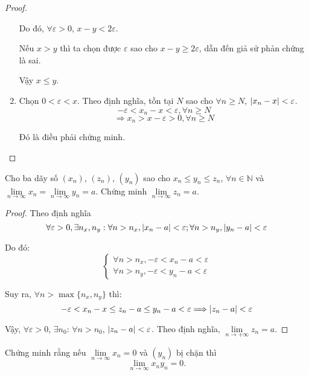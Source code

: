 \documentclass[class=analysis,crop=false]{standalone}
\begin{document}
\begin{proof}
\begin{enumerate}[label = (\roman*)]
            \par Do đó, $\forall\varepsilon > 0$, $x - y < 2\varepsilon$.
            \par Nếu $x > y$ thì ta chọn được $\varepsilon$ sao cho $x - y \ge 2\varepsilon$, dẫn đến giả sử phản chứng là sai.
            \par Vậy $x\le y$.
        \item Chọn $0 < \varepsilon < x$. Theo định nghĩa, tồn tại $N$ sao cho $\forall n \ge N$, $\left\vert{x_{n} - x}\right\vert < \varepsilon$.
            \[
                -\varepsilon < x_{n} - x < \varepsilon, \forall n\ge N
            \]
            \[
                \Rightarrow x_{n} > x - \varepsilon > 0, \forall n\ge N
            \]
            \par Đó là điều phải chứng minh.
    \end{enumerate}
\end{proof}

\begin{exercise}
    Cho ba dãy số $(x_{n})$, $(z_{n})$, $(y_{n})$ sao cho $x_{n} \le y_{n} \le z_{n}$, $\forall n\in\mathbb{N}$ và $\lim\limits_{n\to\infty} x_{n} = \lim\limits_{n\to\infty} y_{n} = a$. Chứng minh $\lim\limits_{n\to\infty} z_{n} = a$.
\end{exercise}

\begin{proof}
    \par Theo định nghĩa
    \[
        \forall\varepsilon > 0, \exists n_{x}, n_{y}: \forall n > n_{x}, \left\vert{x_{n} - a}\right\vert < \varepsilon; \forall n > n_{y}, \left\vert{y_{n} - a}\right\vert < \varepsilon
    \]
    \par Do đó:
    \[
        \begin{cases}
            \forall n > n_{x}, -\varepsilon < x_{n} - a < \varepsilon \\
            \forall n > n_{y}, -\varepsilon < y_{n} - a < \varepsilon
        \end{cases}
    \]
    \par Suy ra, $\forall n > \max\{ n_{x}, n_{y} \}$ thì:
    \[
        -\varepsilon < x_{n} - x \le z_{n} - a \le y_{n} - a < \varepsilon \Longrightarrow \left\vert{z_{n} - a}\right\vert < \varepsilon
    \]
    \par Vậy, $\forall\varepsilon > 0$, $\exists n_{0}$: $\forall n > n_{0}$, $\left\vert{z_{n} - a}\right\vert < \varepsilon$. Theo định nghĩa, $\lim\limits_{n\to+\infty}z_{n} = a$.
\end{proof}

\begin{exercise}
    Chứng minh rằng nếu $\lim\limits_{n\to\infty} x_{n} = 0$ và $(y_{n})$ bị chặn thì
    \[
        \lim\limits_{n\to\infty} x_{n}y_{n} = 0.
    \]
\end{exercise}
\end{document}
